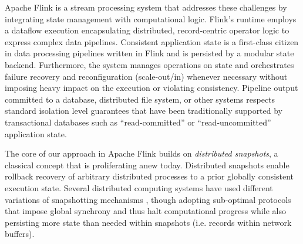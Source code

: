 Apache Flink \cite{CUSTOM:web/Flink} is a stream processing system that addresses these challenges by integrating state management with computational logic. Flink's runtime employs a dataflow execution encapsulating distributed, record-centric operator logic to express complex data pipelines. Consistent application state is a first-class citizen in data processing pipelines written in Flink and is persisted by a modular state backend. Furthermore, the system manages operations on state and orchestrates failure recovery and reconfiguration (scale-out/in) whenever necessary without imposing heavy impact on the execution or violating consistency. Pipeline output committed to a database, distributed file system, or other systems respects standard isolation level guarantees that have been traditionally supported by transactional databases such as ``read-committed'' or ``read-uncommitted'' application state. 

The core of our approach in Apache Flink builds on \emph{distributed snapshots}, a  classical concept that is proliferating anew today. Distributed snapshots enable rollback recovery of arbitrary distributed processes \cite{elnozahy2002survey} to a prior globally consistent execution state. Several distributed computing systems have used different variations of snapshotting mechanisms \cite{murray2013naiad,low2012distributed}, though adopting sub-optimal protocols that impose global synchrony and thus halt computational progress while also persisting more state than needed within snapshots (i.e. records within network buffers).


